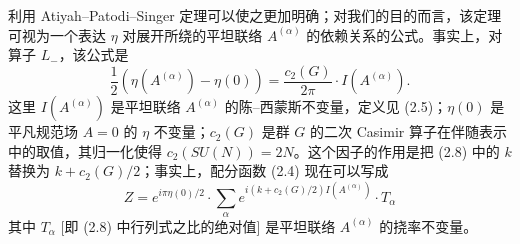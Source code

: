 \documentclass[11pt,a4paper]{article}
\begin{document}

利用 Atiyah--Patodi--Singer 定理可以使之更加明确；对我们的目的而言，该定理可视为一个表达 $\eta$ 对展开所绕的平坦联络 $A^{(\alpha)}$ 的依赖关系的公式。事实上，对算子 $L_-$，该公式是
\begin{equation}
    \frac{1}{2}\left(\eta(A^{(\alpha)})-\eta(0)\right)=\frac{c_2(G)}{2\pi}\cdot I(A^{(\alpha)}).
    \tag{2.16}
\end{equation}
这里 $I(A^{(\alpha)})$ 是平坦联络 $A^{(\alpha)}$ 的陈–西蒙斯不变量，定义见 (2.5)；$\eta(0)$ 是平凡规范场 $A=0$ 的 $\eta$ 不变量；$c_2(G)$ 是群 $G$ 的二次 Casimir 算子在伴随表示中的取值，其归一化使得 $c_2(SU(N))=2N$。这个因子的作用是把 (2.8) 中的 $k$ 替换为 $k+c_2(G)/2$；事实上，配分函数 (2.4) 现在可以写成
\begin{equation}
    Z=e^{i\pi\eta(0)/2}\cdot\sum_\alpha e^{i\left(k+c_2(G)/2\right)I(A^{(\alpha)})}\cdot T_\alpha
    \tag{2.17}
\end{equation}
其中 $T_\alpha$ [即 (2.8) 中行列式之比的绝对值] 是平坦联络 $A^{(\alpha)}$ 的挠率不变量。

\end{document}
